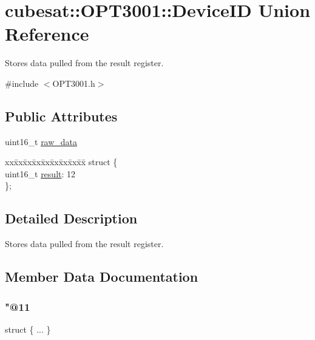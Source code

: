 \hypertarget{unioncubesat_1_1OPT3001_1_1DeviceID}{}\section{cubesat\+:\+:O\+P\+T3001\+:\+:Device\+ID Union Reference}
\label{unioncubesat_1_1OPT3001_1_1DeviceID}


Stores data pulled from the result register.  




{\ttfamily \#include $<$O\+P\+T3001.\+h$>$}

\subsection*{Public Attributes}
\begin{DoxyCompactItemize}
\item 
uint16\+\_\+t \hyperlink{unioncubesat_1_1OPT3001_1_1DeviceID_a07b4ae0da0b4162505e0e39131c7df95}{raw\+\_\+data}
\item 
\begin{tabbing}
xx\=xx\=xx\=xx\=xx\=xx\=xx\=xx\=xx\=\kill
struct \{\\
\>uint16\_t \hyperlink{unioncubesat_1_1OPT3001_1_1DeviceID_aca9343080bb1903c2ef7c8a8b1e980e9}{result}: 12\\
\}; \\

\end{tabbing}\end{DoxyCompactItemize}


\subsection{Detailed Description}
Stores data pulled from the result register. 

\subsection{Member Data Documentation}
\mbox{\label{unioncubesat_1_1OPT3001_1_1DeviceID_ad92a3d1a63e939ebb55d6c97cf7ebffe}} 
\subsubsection{\texorpdfstring{"@11}{@11}}
{\footnotesize\ttfamily struct \{ ... \} }

